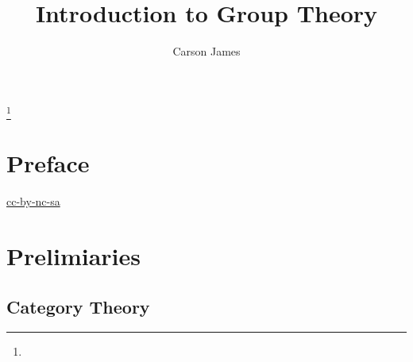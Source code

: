 \documentclass{book}
\begin{document}
	
	\frontmatter
	
	\title{Introduction to Group Theory}
	
	
	\author{Carson James}
	\thanks{}
	
	\date{}
	
	\maketitle
	
	
	\setcounter{page}{4}
	
	\tableofcontents
	\printunsrtglossary[type=symbols,style=long,title={Notation}]
	
	
	\mainmatter
	
	\chapter*{Preface}
	
	\begin{flushleft}
		\href{https://creativecommons.org/licenses/by-nc-sa/4.0/legalcode.txt}{cc-by-nc-sa}
	\end{flushleft}
	
	\newpage
	
	
	
	\chapter{Prelimiaries} 
	
	\section{Category Theory}
	
\end{document}
